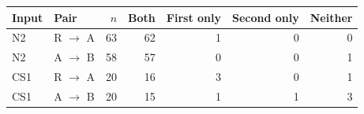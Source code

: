 \begin{tabular}{llrrrrr}
\toprule
Input & Pair & $n$ & Both & First only & Second only & Neither \\
\midrule
N2 & R $\to$ A & 63 & 62 & 1 & 0 & 0 \\
N2 & A $\to$ B & 58 & 57 & 0 & 0 & 1 \\
CS1 & R $\to$ A & 20 & 16 & 3 & 0 & 1 \\
CS1 & A $\to$ B & 20 & 15 & 1 & 1 & 3 \\
\bottomrule
\end{tabular}
